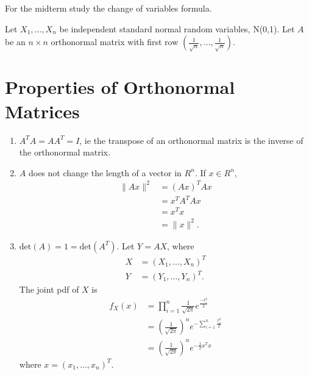 
\begin{note}
	For the midterm study the change of variables formula.
\end{note}

Let $X_{1} , \ldots , X_{n}$ be independent standard normal random variables, N(0,1). Let $A$ be an $n \times n$ orthonormal matrix with first row  $\left( \frac{1}{\sqrt{n} }, \ldots , \frac{1}{\sqrt{n} } \right) $. 

\section{Properties of Orthonormal Matrices}

\begin{enumerate}
	\item $A^{T}A = A A^{T} = I$, ie the transpose of an orthonormal matrix is the inverse of the orthonormal matrix.
	\item $A$ does not change the length of a vector in $R ^{n}$. If $x \in  R ^{n}$, 
		\begin{align*}
			\|Ax\|^2 &= \left( Ax \right) ^{T}Ax \\
			&= x^{T}A^{T}Ax \\
			&= x^{T}x \\
			&= \|x\|^2
		.\end{align*}
	\item $\text{det}\left( A \right) = 1 = \text{det}\left( A^{T} \right) $. Let $Y = AX$, where 
		\begin{align*}
			X &= \left( X_{1} , \ldots , X_{n} \right) ^{T} \\
			Y &= \left( Y_{1} , \ldots , Y_{n} \right) ^{T} 
		.\end{align*}
		The joint pdf of $X$ is 
		\begin{align*}
			f_{X}\left( x \right) &= \prod_{i=1}^{n}\frac{1}{\sqrt{2\pi} }e ^{\frac{-x_{i}^2}{2}} \\
					      &= \left( \frac{1}{\sqrt{2\pi} } \right)^{n}e ^{-\sum_{i=1}^{n} \frac{x_{i}^2}{2}}  \\
&= \left( \frac{1}{\sqrt{2\pi} } \right)^{n}e ^{-\frac{1}{2}x^{T}x}  
		\end{align*}
		where $x = \left( x_{1} , \ldots , x_{n} \right) ^{T}$.


\end{enumerate}
